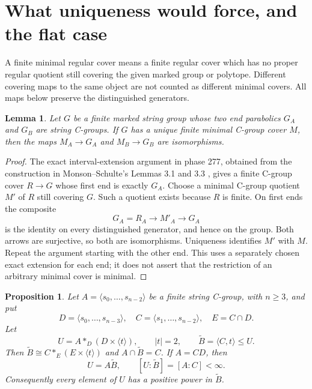\documentclass[11pt]{article}
\newtheorem{proposition}[theorem]{Proposition}
\newtheorem{lemma}[theorem]{Lemma}
\theoremstyle{remark}\newtheorem{remark}[theorem]{Remark}
\newcommand{\gen}[1]{\langle #1\rangle}
\begin{document}
\section{What uniqueness would force, and the flat case}

A finite minimal regular cover means a finite regular cover which has no
proper regular quotient still covering the given marked group or polytope.
Different covering maps to the same object are not counted as different
minimal covers. All maps below preserve the distinguished generators.

\begin{lemma}\label{lem:faithful}
Let \(G\) be a finite marked string group whose two end parabolics \(G_A\)
and \(G_B\) are string C-groups. If \(G\) has a unique finite minimal
C-group cover \(M\), then the maps \(M_A\to G_A\) and \(M_B\to G_B\)
are isomorphisms.
\end{lemma}

\begin{proof}
The exact interval-extension argument in phase 277, obtained from the
construction in Monson--Schulte's Lemmas 3.1 and 3.3 \cite{MS}, gives a
finite C-group cover \(R\to G\) whose first end is exactly \(G_A\).
Choose a minimal C-group quotient \(M'\) of \(R\) still covering \(G\).
Such a quotient exists because \(R\) is finite. On first ends the composite
\[
 G_A=R_A\longrightarrow M'_A\longrightarrow G_A
\]
is the identity on every distinguished generator, and hence on the group.
Both arrows are surjective, so both are isomorphisms. Uniqueness identifies
\(M'\) with \(M\). Repeat the argument starting with the other end.
This uses a separately chosen exact extension for each end; it does not
assert that the restriction of an arbitrary minimal cover is minimal.
\end{proof}

\begin{proposition}\label{prop:flat}
Let \(A=\gen{s_0,\ldots,s_{n-2}}\) be a finite string C-group, with
\(n\geq3\), and put
\[
 D=\gen{s_0,\ldots,s_{n-3}},\quad
 C=\gen{s_1,\ldots,s_{n-2}},\quad E=C\cap D.
\]
Let
\[
 U=A*_{D}(D\times\gen{t}),\qquad |t|=2,
 \qquad \widetilde B=\gen{C,t}\leq U.
\]
Then \(\widetilde B\cong C*_{E}(E\times\gen t)\) and
\(A\cap\widetilde B=C\). If \(A=CD\), then
\[
 U=A\widetilde B,\qquad [U:\widetilde B]=[A:C]<\infty.
\]
Consequently every element of \(U\) has a positive power in
\(\widetilde B\).
\end{proposition}
\end{document}
